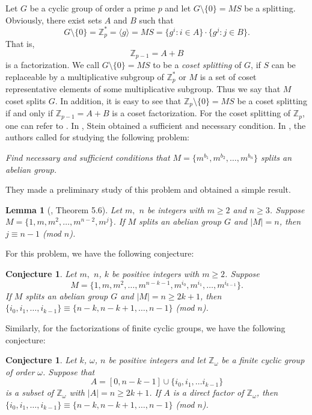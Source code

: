 \documentclass[preprint]{elsarticle}
\newtheorem{lem}[thm]{Lemma}
\newtheorem{conj}[thm]{Conjecture}
\begin{document}
Let $G$ be a cyclic group of order a prime $p$ and let $G\setminus \{0\}=MS$ be a splitting.
Obviously, there exist sets $A$ and $B$ such that
$$G\setminus \{0\}=\mathbb{Z}_p^*=\langle g\rangle=MS=\{g^i:i\in A\}\cdot \{g^j: j\in B\}.$$
That is, $$\mathbb{Z}_{p-1}=A+B$$ is a factorization.
We call $G\setminus \{0\}=MS$ to be a \textit{coset splitting} of $G$, if $S$ can be replaceable by a multiplicative subgroup of $\mathbb{Z}_p^*$ or $M$ is a set of coset representative elements of some multiplicative subgroup.
Thus we say that $M$ coset splits $G$.
In addition, it is easy to see that $\mathbb{Z}_p\setminus \{0\}=MS$ be a coset splitting if and only if $\mathbb{Z}_{p-1}=A+B$ is a coset factorization.
For the coset splitting of $\mathbb{Z}_p$, one can refer to \cite{[GS],S87}.
In \cite{S87}, Stein obtained a sufficient and necessary condition.
In \cite{[GS]}, the authors  called for studying the following problem:

\textsl{Find necessary and sufficient conditions that $M=\{m^{b_1},m^{b_2},\ldots ,m^{b_n}\}$ splits an abelian group.}

They made a preliminary study of this problem and obtained a simple result.

\begin{lem}[\cite{[GS]}, Theorem 5.6] \label{inverse-n-1}
Let $m,$ $n$ be integers with $m\geq 2$ and $n\geq 3$. Suppose $M=\{1,m,m^2,\ldots ,m^{n-2},m^j\}$.
If $M$ splits an abelian group $G$ and $|M|=n$, then $j\equiv n-1$ (mod $n$).
\end{lem}

For this problem, we have the following conjecture:

\begin{conj} \label{mainconjspl}
Let $m,$ $n$, $k$ be positive integers with $m\geq 2$.
Suppose $$M=\{1,m,m^2,\ldots ,m^{n-k-1},m^{i_0},m^{i_1},\ldots ,m^{i_{k-1}}\}.$$
If $M$ splits an abelian group $G$ and $|M|=n\geq 2k+1$, then $\{i_0,i_1,\ldots ,i_{k-1}\}\equiv \{n-k,n-k+1,\ldots ,n-1\}$ (mod $n$).
\end{conj}

Similarly, for the factorizations of finite cyclic groups, we have the following conjecture:
\begin{conj} \label{mainconj}
Let $k$, $\omega$, $n$ be positive integers and let $\mathbb{Z}_{\omega}$ be a finite cyclic group of order $\omega$.
Suppose that $$A=[0,n-k-1]\cup\{i_0,i_1,\ldots i_{k-1}\}$$
is a subset of $\mathbb{Z}_{\omega}$ with $|A|=n\geq 2k+1$.
If $A$ is a direct factor of $\mathbb{Z}_{\omega}$, then $\{i_0,i_1,\ldots ,i_{k-1}\}\equiv \{n-k,n-k+1,\ldots ,n-1\}$ (mod $n$).
\end{conj}
\end{document}
